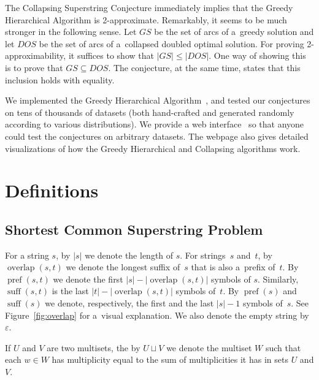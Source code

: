 \documentclass[11pt]{article}
\DeclareMathOperator{\overlap}{overlap}
\DeclareMathOperator{\pref}{pref}
\DeclareMathOperator{\suff}{suff}
\begin{document}


The Collapsing Superstring Conjecture immediately implies that the Greedy
Hierarchical Algorithm is 2-approximate. Remarkably, it seems to be much
stronger in the following sense. Let $GS$ be the set of arcs of a~greedy
solution and let $DOS$ be the set of arcs of a~collapsed doubled optimal
solution. For proving 2-approximability, it suffices to show that $|GS| \le |DOS|$. 
One way of showing this is to prove that $GS \subseteq DOS$. 
The conjecture, at the same time, states that this inclusion holds with equality.

We implemented the Greedy Hierarchical Algorithm~\cite{github}, and tested our conjectures on tens of thousands of datasets (both hand-crafted and generated randomly according to various distributions). We provide a web interface~\cite{webpage} so that anyone could test the conjectures on arbitrary datasets. The webpage also gives detailed visualizations of how the Greedy Hierarchical and Collapsing algorithms work.

\section{Definitions}
\subsection{Shortest Common Superstring Problem}
\label{sec:def_scs}
For a string $s$, by $|s|$ we denote the length of $s$. 
For strings~$s$ and~$t$, by $\overlap(s,t)$
we denote the longest suffix of~$s$ that is also 
a~prefix of~$t$. By $\pref(s,t)$
we denote the first $|s|-|\overlap(s,t)|$ symbols of $s$.
Similarly, $\suff(s,t)$ is the last
$|t|-|\overlap(s,t)|$ symbols of~$t$. 
By $\pref(s)$ and $\suff(s)$ we denote, respectively,
the first and the last $|s|-1$ symbols of~$s$. See Figure~\ref{fig:overlap} for a~visual explanation. We also denote the empty string by $\varepsilon$.

If $U$ and $V$ are two multisets, the by $U\sqcup V$ we denote the multiset $W$ such that each $w\in W$ has multiplicity equal to the sum of multiplicities it has in sets $U$ and $V$.
\end{document}
